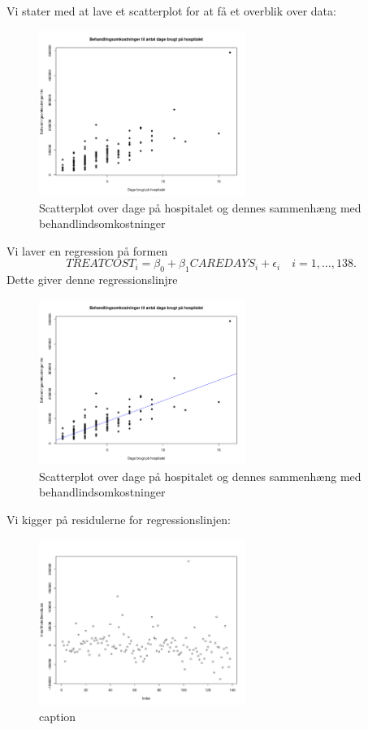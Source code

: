 \documentclass{article}
\begin{document}
Vi stater med at lave et scatterplot for at få et overblik over data:
\begin{figure}[H]
  \centering
  \includegraphics[width=0.6\textwidth]{./plots/caredaysScatterPlot.pdf}
  \caption{Scatterplot over dage på hospitalet og dennes sammenhæng med
  behandlindsomkostninger}
\end{figure}

Vi laver en regression på formen 
\[
TREATCOST_i = \beta_0 + \beta_1CAREDAYS_i + \epsilon_i \quad i = 1,\dots,138
.\] 
Dette giver denne regressionslinjre

\begin{figure}[H]
  \centering
  \includegraphics[width=0.6\textwidth]{./plots/caredaysScatterPlotAbline.pdf}
  \caption{Scatterplot over dage på hospitalet og dennes sammenhæng med
  behandlindsomkostninger}
\end{figure}

Vi kigger på residulerne for regressionslinjen: 

\begin{figure}[H]
  \centering
  \includegraphics[width=0.6\textwidth]{./plots/caredaysResiduals.pdf}
  \caption{caption}
\end{figure}
\end{document}
